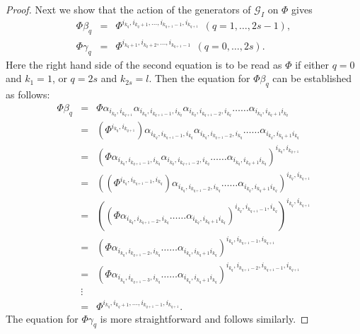 \documentclass[10pt,a4paper]{amsart}
\begin{document}
\begin{proof}
Next we show that the action of the generators of $\mathcal{G}_{I}$ on $\Phi$ gives
\begin{eqnarray*}
\Phi \beta_q      &\!=\!& \Phi^{i_{k_{q}}, i_{k_q+1}, \dots, i_{k_{q+1}-1} , i_{k_{q+1}}} \;\,(q=1,\ldots,2s-1), \\ 
\Phi \gamma_q &\!=\!& \Phi^{i_{k_q+1}, i_{k_q+2}, \dots, i_{k_{q+1}-1}} \;\,(q=0,\ldots,2s).
\end{eqnarray*}
Here the right hand side of the second equation is to be read as $\Phi$ if either $q=0$ and $k_{1}=1$, or $q=2s$ and $k_{2s}=l$. Then the equation for $\Phi\beta_q $ can be established as follows:
\[\begin{array}{lll}
\Phi \beta_q 
&=& \Phi \alpha_{i_{k_q},i_{k_{q+1}}} \alpha_{i_{k_q}, i_{k_{q+1}-1}, i_{k_q}} \alpha_{i_{k_q}, i_{k_{q+1}-2}, i_{k_q}} \ldots\ldots \alpha_{i_{k_q}, i_{k_q+1} i_{k_q}}\\[.05in]
&=& (\Phi^{i_{k_q},i_{k_{q+1}}}) \alpha_{i_{k_q}, i_{k_{q+1}-1}, i_{k_q}} \alpha_{i_{k_q}, i_{k_{q+1}-2}, i_{k_q}} \ldots\ldots \alpha_{i_{k_q}, i_{k_q+1} i_{k_q}}\\[.05in]
&=& (\Phi \alpha_{i_{k_q}, i_{k_{q+1}-1}, i_{k_q}} \alpha_{i_{k_q}, i_{k_{q+1}-2}, i_{k_q}} \ldots\ldots \alpha_{i_{k_q}, i_{k_q+1} i_{k_q}})^{i_{k_q},i_{k_{q+1}}}\\[.05in]
&=& ((\Phi^{i_{k_q}, i_{k_{q+1}-1}, i_{k_q}}) \alpha_{i_{k_q}, i_{k_{q+1}-2}, i_{k_q}} \ldots\ldots \alpha_{i_{k_q}, i_{k_q+1} i_{k_q}})^{i_{k_q},i_{k_{q+1}}}\\[.05in]
&=& ((\Phi \alpha_{i_{k_q}, i_{k_{q+1}-2}, i_{k_q}} \ldots\ldots \alpha_{i_{k_q}, i_{k_q+1} i_{k_q}})^{i_{k_q}, i_{k_{q+1}-1}, i_{k_q}})^{i_{k_q},i_{k_{q+1}}}\\[.05in]
&=& (\Phi \alpha_{i_{k_q}, i_{k_{q+1}-2}, i_{k_q}} \ldots\ldots \alpha_{i_{k_q}, i_{k_q+1} i_{k_q}})^{i_{k_q}, i_{k_{q+1}-1},i_{k_{q+1}}}\\[.05in]
&=& (\Phi \alpha_{i_{k_q}, i_{k_{q+1}-3}, i_{k_q}} \ldots\ldots \alpha_{i_{k_q}, i_{k_q+1} i_{k_q}})^{i_{k_q},i_{k_{q+1}-2},i_{k_{q+1}-1},i_{k_{q+1}}}\\[.02in]
&\vdots&\\[.02in]
&=& \Phi^{i_{k_{q}}, i_{k_q+1}, \dots, i_{k_{q+1}-1} , i_{k_{q+1}}}.
\end{array} \]
The equation for $\Phi \gamma_q$ is more straightforward and follows similarly.


\end{proof}
\end{document}
